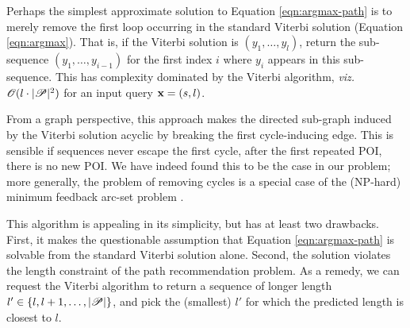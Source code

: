 
Perhaps the simplest approximate solution to Equation \ref{eqn:argmax-path} is to merely remove the first loop occurring in the standard Viterbi solution (Equation \ref{eqn:argmax}).
That is, if the Viterbi solution is $( y_1, \ldots, y_l )$,
return the sub-sequence $( y_1, \ldots, y_{i-1} )$
for the first index $i$ where $y_i$ appears in this sub-sequence.
This has complexity dominated by the Viterbi algorithm, \emph{viz.} $\mathscr{O}(l \cdot |\mathscr{P}|^2)$ for an input query $\mathbf{x} = (s, l)$.

From a graph perspective, this approach makes the directed sub-graph induced by the Viterbi solution acyclic
by breaking the first cycle-inducing edge.
This is sensible if sequences never escape the first cycle, \ie after the first repeated POI, there is no new POI.
We have indeed found this to be the case in our problem; %
more generally, %
the problem of removing cycles is a special case of the ({\sf NP}-hard) minimum feedback arc-set problem \citep[pg.\ 192]{Garey:1990}.

This algorithm is appealing in its simplicity,
but has at least two drawbacks.
First, it makes the questionable assumption that Equation \ref{eqn:argmax-path} is solvable from the standard Viterbi solution alone.
Second, the solution violates the length constraint of the path recommendation problem.
As a remedy,
we can request the Viterbi algorithm to return a sequence of longer length
$l' \in \{ l, l + 1, \ldots, |\mathscr{P}| \}$, and pick the (smallest) $l'$ for which the predicted length is closest to $l$.

